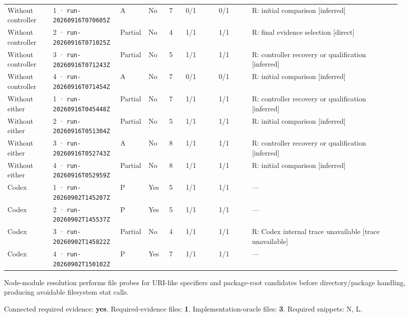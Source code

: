\begin{landscape}
\begin{longtable}{@{}L{0.11\linewidth}L{0.16\linewidth}*{1}{L{0.022\linewidth}}L{0.05\linewidth}L{0.045\linewidth}L{0.08\linewidth}L{0.085\linewidth}L{0.368\linewidth}@{}}
Without controller & 1 · \texttt{run-20260916\allowbreak T070605Z} & A & No & 7 & 0/1 & 0/1 & R: initial comparison [inferred] \\
Without controller & 2 · \texttt{run-20260916\allowbreak T071025Z} & Partial & No & 4 & 1/1 & 1/1 & R: final evidence selection [direct] \\
Without controller & 3 · \texttt{run-20260916\allowbreak T071243Z} & Partial & No & 5 & 1/1 & 1/1 & R: controller recovery or qualification [inferred] \\
Without controller & 4 · \texttt{run-20260916\allowbreak T071454Z} & A & No & 7 & 0/1 & 0/1 & R: initial comparison [inferred] \\
Without either & 1 · \texttt{run-20260916\allowbreak T045448Z} & Partial & No & 7 & 1/1 & 1/1 & R: controller recovery or qualification [inferred] \\
Without either & 2 · \texttt{run-20260916\allowbreak T051304Z} & Partial & No & 5 & 1/1 & 1/1 & R: initial comparison [inferred] \\
Without either & 3 · \texttt{run-20260916\allowbreak T052743Z} & A & No & 8 & 1/1 & 1/1 & R: controller recovery or qualification [inferred] \\
Without either & 4 · \texttt{run-20260916\allowbreak T052959Z} & Partial & No & 8 & 1/1 & 1/1 & R: initial comparison [inferred] \\
Codex & 1 · \texttt{run-20260902\allowbreak T145207Z} & P & Yes & 5 & 1/1 & 1/1 & --- \\
Codex & 2 · \texttt{run-20260902\allowbreak T145537Z} & P & Yes & 5 & 1/1 & 1/1 & --- \\
Codex & 3 · \texttt{run-20260902\allowbreak T145822Z} & Partial & No & 4 & 1/1 & 1/1 & R: Codex internal trace unavailable [trace unavailable] \\
Codex & 4 · \texttt{run-20260902\allowbreak T150102Z} & P & Yes & 7 & 1/1 & 1/1 & --- \\
\end{longtable}
\endgroup
\end{landscape}

\label{sec:microsoft-typescript-52695}

Node-module resolution performs file probes for URI-like specifiers and package-root candidates before directory/package handling, producing avoidable filesystem stat calls.

Connected required evidence: \textbf{yes}. Required-evidence files: \textbf{1}. Implementation-oracle files: \textbf{3}. Required snippets: N, L.

